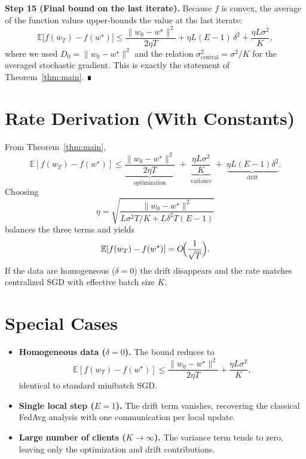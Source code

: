 \documentclass{article}
\begin{document}
\noindent\textbf{Step 15 (Final bound on the last iterate).}  
Because $f$ is convex, the average of the function values upper‑bounds the
value at the last iterate:
\[
\mathbb{E}\!\bigl[f(w_T)-f(w^\star)\bigr]
\le
\frac{\|w_0-w^\star\|^2}{2\eta T}
+\eta L (E-1)\,\delta^2
+\frac{\eta L\sigma^2}{K},
\]
where we used $D_0=\|w_0-w^\star\|^2$ and the relation
$\sigma^2_{\text{central}}=\sigma^2/K$ for the averaged stochastic gradient.
This is exactly the statement of Theorem~\ref{thm:main}. ∎

\section*{Rate Derivation (With Constants)}
From Theorem~\ref{thm:main},
\[
\mathbb{E}[f(w_T)-f(w^\star)]
\le
\underbrace{\frac{\|w_0-w^\star\|^2}{2\eta T}}_{\text{optimization}}
\;+\;
\underbrace{\frac{\eta L\sigma^2}{K}}_{\text{variance}}
\;+\;
\underbrace{\eta L (E-1)\delta^2}_{\text{drift}} .
\]
Choosing
\[
\eta = \sqrt{\frac{\|w_0-w^\star\|^2}{L\sigma^2 T/K + L\delta^2 T (E-1)}}
\]
balances the three terms and yields
\[
\mathbb{E}[f(w_T)-f(w^\star)] = O\!\Bigl(\frac{1}{\sqrt{T}}\Bigr).
\]
If the data are homogeneous ($\delta=0$) the drift disappears and the rate
matches centralized SGD with effective batch size $K$.

\section*{Special Cases}
\begin{itemize}
\item \textbf{Homogeneous data ($\delta=0$).} The bound reduces to
\[
\mathbb{E}[f(w_T)-f(w^\star)]\le
\frac{\|w_0-w^\star\|^2}{2\eta T}
+\frac{\eta L\sigma^2}{K},
\]
identical to standard minibatch SGD.
\item \textbf{Single local step ($E=1$).} The drift term vanishes, recovering
the classical FedAvg analysis with one communication per local update.
\item \textbf{Large number of clients ($K\to\infty$).} The variance term tends to
zero, leaving only the optimization and drift contributions.
\end{itemize}
\end{document}
